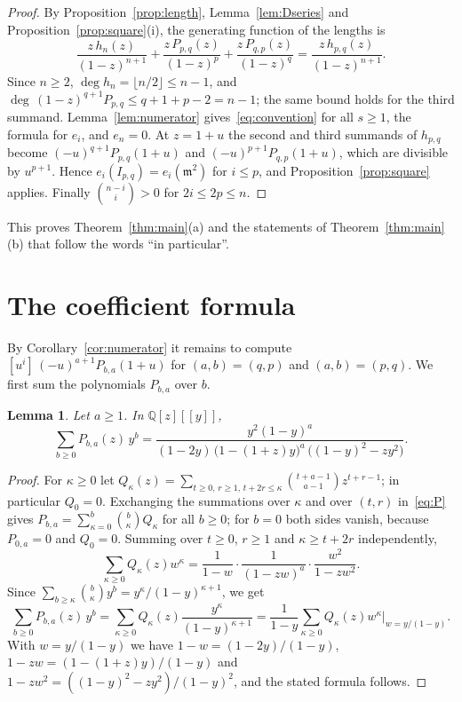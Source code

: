 \documentclass{amsart}
\newtheorem{lemma}[theorem]{Lemma}
\theoremstyle{definition}
\theoremstyle{remark}
\numberwithin{equation}{section}
\newcommand{\QQ}{\mathbb{Q}}
\newcommand{\mm}{\mathfrak{m}}
\newcommand{\cf}[1]{[#1]\,}
\newcommand{\fl}[1]{\lfloor #1\rfloor}
\begin{document}
\begin{proof}
By Proposition~\ref{prop:length}, Lemma~\ref{lem:Dseries} and
Proposition~\ref{prop:square}(i), the generating function of the lengths is
\[
  \frac{z\,h_n(z)}{(1-z)^{n+1}}+\frac{z\,P_{p,q}(z)}{(1-z)^{p}}
  +\frac{z\,P_{q,p}(z)}{(1-z)^{q}}
  =\frac{z\,h_{p,q}(z)}{(1-z)^{n+1}}.
\]
Since $n\ge2$, $\deg h_n=\fl{n/2}\le n-1$, and
$\deg\,(1-z)^{q+1}P_{p,q}\le q+1+p-2=n-1$; the same bound holds for the third
summand. Lemma~\ref{lem:numerator} gives~\eqref{eq:convention} for all $s\ge1$,
the formula for $e_i$, and $e_n=0$. At $z=1+u$ the second and third summands of
$h_{p,q}$ become $(-u)^{q+1}P_{p,q}(1+u)$ and $(-u)^{p+1}P_{q,p}(1+u)$, which are
divisible by $u^{p+1}$. Hence $e_i(I_{p,q})=e_i(\mm^2)$ for $i\le p$, and
Proposition~\ref{prop:square} applies. Finally $\binom{n-i}{i}>0$ for
$2i\le 2p\le n$.
\end{proof}

This proves Theorem~\ref{thm:main}(a) and the statements of
Theorem~\ref{thm:main}(b) that follow the words ``in particular''.

\section{The coefficient formula}\label{sec:coefficients}

By Corollary~\ref{cor:numerator} it remains to compute
$\cf{u^i}(-u)^{a+1}P_{b,a}(1+u)$ for $(a,b)=(q,p)$ and $(a,b)=(p,q)$. We first
sum the polynomials $P_{b,a}$ over $b$.

\begin{lemma}\label{lem:Pseries}
Let $a\ge1$. In $\QQ[z][[y]]$,
\[
  \sum_{b\ge0}P_{b,a}(z)\,y^b
  =\frac{y^2(1-y)^a}{(1-2y)\,\bigl(1-(1+z)y\bigr)^a\,\bigl((1-y)^2-zy^2\bigr)}.
\]
\end{lemma}

\begin{proof}
For $\kappa\ge0$ let
$Q_\kappa(z)=\sum_{t\ge0,\,r\ge1,\,t+2r\le \kappa}\binom{t+a-1}{a-1}z^{t+r-1}$;
in particular $Q_0=0$. Exchanging the summations over $\kappa$ and over $(t,r)$
in~\eqref{eq:P} gives $P_{b,a}=\sum_{\kappa=0}^{b}\binom{b}{\kappa}Q_\kappa$ for
all $b\ge0$; for $b=0$ both sides vanish, because $P_{0,a}=0$ and $Q_0=0$.
Summing over $t\ge0$, $r\ge1$ and $\kappa\ge t+2r$ independently,
\[
  \sum_{\kappa\ge0}Q_\kappa(z)w^\kappa=\frac{1}{1-w}\cdot\frac{1}{(1-zw)^a}\cdot\frac{w^2}{1-zw^2}.
\]
Since $\sum_{b\ge \kappa}\binom{b}{\kappa}y^b=y^\kappa/(1-y)^{\kappa+1}$, we get
\[
  \sum_{b\ge0}P_{b,a}(z)\,y^b=\sum_{\kappa\ge0}Q_\kappa(z)\frac{y^\kappa}{(1-y)^{\kappa+1}}
  =\frac{1}{1-y}\sum_{\kappa\ge0}Q_\kappa(z)w^\kappa\Big|_{w=y/(1-y)}.
\]
With $w=y/(1-y)$ we have $1-w=(1-2y)/(1-y)$, $1-zw=(1-(1+z)y)/(1-y)$ and
$1-zw^2=((1-y)^2-zy^2)/(1-y)^2$, and the stated formula follows.
\end{proof}
\end{document}
